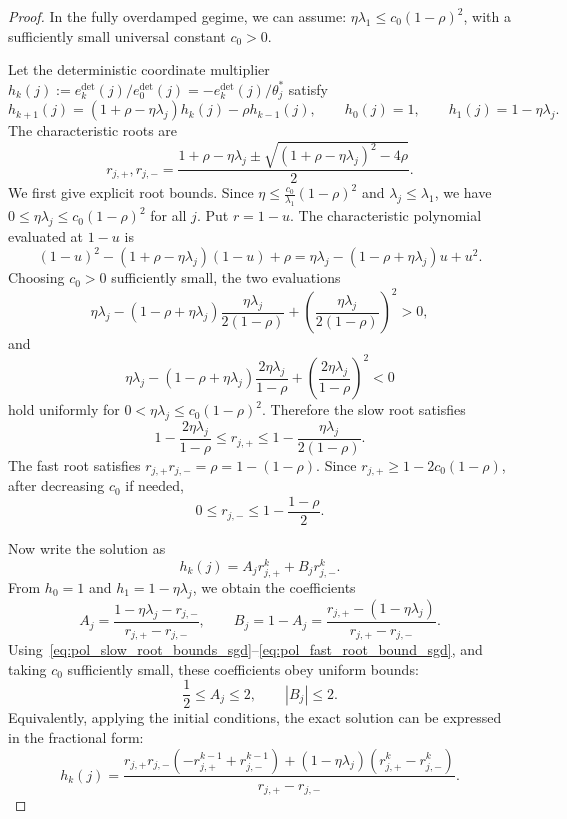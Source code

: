 \begin{proof}
In the fully overdamped gegime, we can assume: $\eta\lambda_1\le c_0 (1-\rho)^2$, with a sufficiently small universal constant $c_0>0$.

Let the deterministic coordinate multiplier $h_k(j):=e_k^{\mathrm{det}}(j)/e_0^{\mathrm{det}}(j) = -e_k^{\mathrm{det}}(j)/\theta_j^*$ satisfy
\[
    h_{k+1}(j)=(1+\rho-\eta\lambda_j)h_k(j)-\rho h_{k-1}(j),
    \qquad
    h_0(j)=1,
    \qquad
    h_1(j)=1-\eta\lambda_j.
\]
The characteristic roots are
\[
    r_{j,+},r_{j,-}
    =
    \frac{1+\rho-\eta\lambda_j\pm\sqrt{(1+\rho-\eta\lambda_j)^2-4\rho}}{2}.
\]
We first give explicit root bounds. Since $\eta\le \frac{c_0}{\lambda_1}(1-\rho)^2$ and $\lambda_j\le\lambda_1$, we have $0\le \eta\lambda_j\le c_0(1-\rho)^2$ for all $j$. Put $r=1-u$. The characteristic polynomial evaluated at $1-u$ is
\[
    (1-u)^2-(1+\rho-\eta\lambda_j)(1-u)+\rho
    =
    \eta\lambda_j-(1-\rho+\eta\lambda_j)u+u^2.
\]
Choosing $c_0>0$ sufficiently small, the two evaluations
\[
    \eta\lambda_j-(1-\rho+\eta\lambda_j)\frac{\eta\lambda_j}{2(1-\rho)}+\left(\frac{\eta\lambda_j}{2(1-\rho)}\right)^2>0,
\]
and
\[
    \eta\lambda_j-(1-\rho+\eta\lambda_j)\frac{2\eta\lambda_j}{1-\rho}+\left(\frac{2\eta\lambda_j}{1-\rho}\right)^2<0
\]
hold uniformly for $0<\eta\lambda_j\le c_0(1-\rho)^2$. Therefore the slow root satisfies
\begin{equation}
\label{eq:pol_slow_root_bounds_sgd}
    1-\frac{2\eta\lambda_j}{1-\rho}
    \le
    r_{j,+}
    \le
    1-\frac{\eta\lambda_j}{2(1-\rho)}.
\end{equation}
The fast root satisfies $r_{j,+}r_{j,-}=\rho=1-(1-\rho)$. Since $r_{j,+}\ge1-2c_0(1-\rho)$, after decreasing $c_0$ if needed,
\begin{equation}
\label{eq:pol_fast_root_bound_sgd}
    0\le r_{j,-}\le 1-\frac{1-\rho}{2}.
\end{equation}

Now write the solution as
\[
    h_k(j)=A_jr_{j,+}^k+B_jr_{j,-}^k.
\]
From $h_0=1$ and $h_1=1-\eta\lambda_j$, we obtain the coefficients
\[
    A_j=\frac{1-\eta\lambda_j-r_{j,-}}{r_{j,+}-r_{j,-}},
    \qquad
    B_j=1-A_j = \frac{r_{j,+}-(1-\eta\lambda_j)}{r_{j,+}-r_{j,-}}.
\]
Using~\eqref{eq:pol_slow_root_bounds_sgd}--\eqref{eq:pol_fast_root_bound_sgd}, and taking $c_0$ sufficiently small, these coefficients obey uniform bounds:
\begin{equation}
\label{eq:pol_sgd_coeff_bounds}
    \frac12\le A_j\le2,
    \qquad
    |B_j|\le2.
\end{equation}
Equivalently, applying the initial conditions, the exact solution can be expressed in the fractional form:
\begin{equation}
\label{eq:hk_exact_form}
    h_k(j) = \frac{r_{j,+} r_{j,-}\left(-r_{j,+}^{k-1} + r_{j,-}^{k-1}\right) + (1-\eta\lambda_j)\left(r_{j,+}^k - r_{j,-}^k\right)}{r_{j,+} - r_{j,-}}.
\end{equation}


\end{proof}
